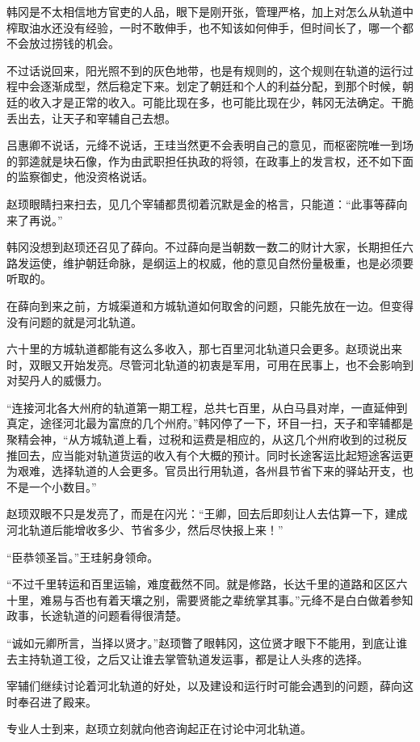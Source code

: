 韩冈是不太相信地方官吏的人品，眼下是刚开张，管理严格，加上对怎么从轨道中榨取油水还没有经验，一时不敢伸手，也不知该如何伸手，但时间长了，哪一个都不会放过捞钱的机会。

不过话说回来，阳光照不到的灰色地带，也是有规则的，这个规则在轨道的运行过程中会逐渐成型，然后稳定下来。划定了朝廷和个人的利益分配，到那个时候，朝廷的收入才是正常的收入。可能比现在多，也可能比现在少，韩冈无法确定。干脆丢出去，让天子和宰辅自己去想。

吕惠卿不说话，元绛不说话，王珪当然更不会表明自己的意见，而枢密院唯一到场的郭逵就是块石像，作为由武职担任执政的将领，在政事上的发言权，还不如下面的监察御史，他没资格说话。

赵顼眼睛扫来扫去，见几个宰辅都贯彻着沉默是金的格言，只能道：“此事等薛向来了再说。”

韩冈没想到赵顼还召见了薛向。不过薛向是当朝数一数二的财计大家，长期担任六路发运使，维护朝廷命脉，是纲运上的权威，他的意见自然份量极重，也是必须要听取的。

在薛向到来之前，方城渠道和方城轨道如何取舍的问题，只能先放在一边。但变得没有问题的就是河北轨道。

六十里的方城轨道都能有这么多收入，那七百里河北轨道只会更多。赵顼说出来时，双眼又开始发亮。尽管河北轨道的初衷是军用，可用在民事上，也不会影响到对契丹人的威慑力。

“连接河北各大州府的轨道第一期工程，总共七百里，从白马县对岸，一直延伸到真定，途径河北最为富庶的几个州府。”韩冈停了一下，环目一扫，天子和宰辅都是聚精会神，“从方城轨道上看，过税和运费是相应的，从这几个州府收到的过税反推回去，应当能对轨道货运的收入有个大概的预计。同时长途客运比起短途客运更为艰难，选择轨道的人会更多。官员出行用轨道，各州县节省下来的驿站开支，也不是一个小数目。”

赵顼双眼不只是发亮了，而是在闪光：“王卿，回去后即刻让人去估算一下，建成河北轨道后能增收多少、节省多少，然后尽快报上来！”

“臣恭领圣旨。”王珪躬身领命。

“不过千里转运和百里运输，难度截然不同。就是修路，长达千里的道路和区区六十里，难易与否也有着天壤之别，需要贤能之辈统掌其事。”元绛不是白白做着参知政事，长途轨道的问题看得很清楚。

“诚如元卿所言，当择以贤才。”赵顼瞥了眼韩冈，这位贤才眼下不能用，到底让谁去主持轨道工役，之后又让谁去掌管轨道发运事，都是让人头疼的选择。

宰辅们继续讨论着河北轨道的好处，以及建设和运行时可能会遇到的问题，薛向这时奉召进了殿来。

专业人士到来，赵顼立刻就向他咨询起正在讨论中河北轨道。

